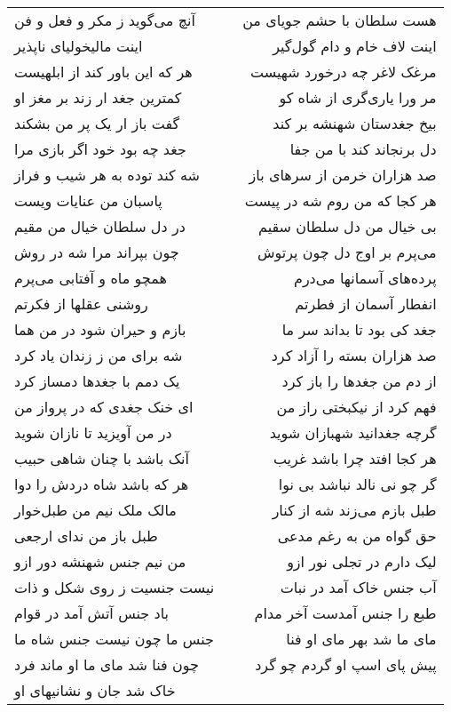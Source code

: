 \begin{center}
\begin{longtable}{l p{0.5cm} r}
\\
آنچ می‌گوید ز مکر و فعل و فن
&&
هست سلطان با حشم جویای من
\\
اینت مالیخولیای ناپذیر
&&
اینت لاف خام و دام گول‌گیر
\\
هر که این باور کند از ابلهیست
&&
مرغک لاغر چه درخورد شهیست
\\
کمترین جغد ار زند بر مغز او
&&
مر ورا یاری‌گری از شاه کو
\\
گفت باز ار یک پر من بشکند
&&
بیخ جغدستان شهنشه بر کند
\\
جغد چه بود خود اگر بازی مرا
&&
دل برنجاند کند با من جفا
\\
شه کند توده به هر شیب و فراز
&&
صد هزاران خرمن از سرهای باز
\\
پاسبان من عنایات ویست
&&
هر کجا که من روم شه در پیست
\\
در دل سلطان خیال من مقیم
&&
بی خیال من دل سلطان سقیم
\\
چون بپراند مرا شه در روش
&&
می‌پرم بر اوج دل چون پرتوش
\\
همچو ماه و آفتابی می‌پرم
&&
پرده‌های آسمانها می‌درم
\\
روشنی عقلها از فکرتم
&&
انفطار آسمان از فطرتم
\\
بازم و حیران شود در من هما
&&
جغد کی بود تا بداند سر ما
\\
شه برای من ز زندان یاد کرد
&&
صد هزاران بسته را آزاد کرد
\\
یک دمم با جغدها دمساز کرد
&&
از دم من جغدها را باز کرد
\\
ای خنک جغدی که در پرواز من
&&
فهم کرد از نیکبختی راز من
\\
در من آویزید تا نازان شوید
&&
گرچه جغدانید شهبازان شوید
\\
آنک باشد با چنان شاهی حبیب
&&
هر کجا افتد چرا باشد غریب
\\
هر که باشد شاه دردش را دوا
&&
گر چو نی نالد نباشد بی نوا
\\
مالک ملک نیم من طبل‌خوار
&&
طبل بازم می‌زند شه از کنار
\\
طبل باز من ندای ارجعی
&&
حق گواه من به رغم مدعی
\\
من نیم جنس شهنشه دور ازو
&&
لیک دارم در تجلی نور ازو
\\
نیست جنسیت ز روی شکل و ذات
&&
آب جنس خاک آمد در نبات
\\
باد جنس آتش آمد در قوام
&&
طبع را جنس آمدست آخر مدام
\\
جنس ما چون نیست جنس شاه ما
&&
مای ما شد بهر مای او فنا
\\
چون فنا شد مای ما او ماند فرد
&&
پیش پای اسپ او گردم چو گرد
\\
خاک شد جان و نشانیهای او

\end{longtable}
\end{center}

